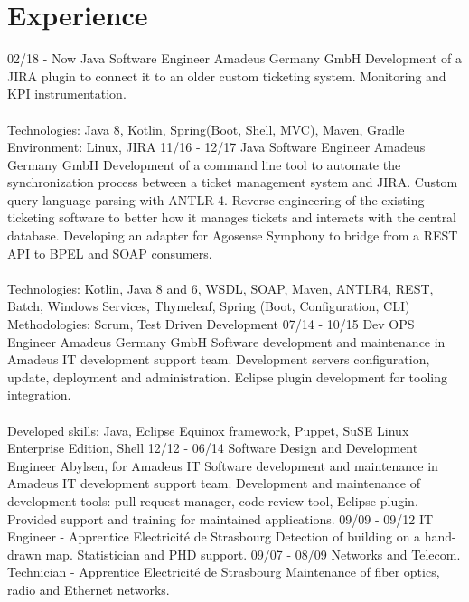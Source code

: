 \documentclass[]{friggeri-cv}
\begin{document}
\section{Experience}
\begin{entrylist}
  \entry
    {02/18 - Now}
    {Java Software Engineer}
    {Amadeus Germany GmbH}
    {Development of a JIRA plugin to connect it to an older custom ticketing system. Monitoring and KPI instrumentation.\\
    \\
    Technologies: Java 8, Kotlin, Spring(Boot, Shell, MVC), Maven, Gradle \\
    Environment: Linux, JIRA}
  \entry
    {11/16 - 12/17}
    {Java Software Engineer}
    {Amadeus Germany GmbH}
    {Development of a command line tool to automate the synchronization process between a ticket management system and JIRA. Custom query language parsing with ANTLR 4. Reverse engineering of the existing ticketing software to better how it manages tickets and interacts with the central database. Developing an adapter for Agosense Symphony to bridge from a REST API to BPEL and SOAP consumers.\\
    \\
    Technologies: Kotlin, Java 8 and 6, WSDL, SOAP, Maven, ANTLR4, REST, Batch, Windows Services, Thymeleaf, Spring (Boot, Configuration, CLI) \\
    Methodologies: Scrum, Test Driven Development}
    \entry
    {07/14 - 10/15}
    {Dev OPS Engineer}
    {Amadeus Germany GmbH}
    {Software development and maintenance in Amadeus IT development support team.
Development servers configuration, update, deployment and administration.
Eclipse plugin development for tooling integration.\\
	\\
	Developed skills: Java, Eclipse Equinox framework, Puppet, SuSE Linux Enterprise Edition, Shell}
    \entry
    {12/12 - 06/14}
    {Software Design and Development Engineer}
    {Abylsen, for Amadeus IT}
    {Software development and maintenance in Amadeus IT development support team.
Development and maintenance of development tools: pull request manager, code review tool, Eclipse plugin.
Provided support and training for maintained applications.}
    \entry
    {09/09 - 09/12}
    {IT Engineer - Apprentice}
    {Electricité de Strasbourg}
    {Detection of building on a hand-drawn map. Statistician and PHD support.}
    \entry
    {09/07 - 08/09}
    {Networks and Telecom. Technician - Apprentice}
    {Electricité de Strasbourg}
    {Maintenance of fiber optics, radio and Ethernet networks.}
\end{entrylist}
\end{document}
